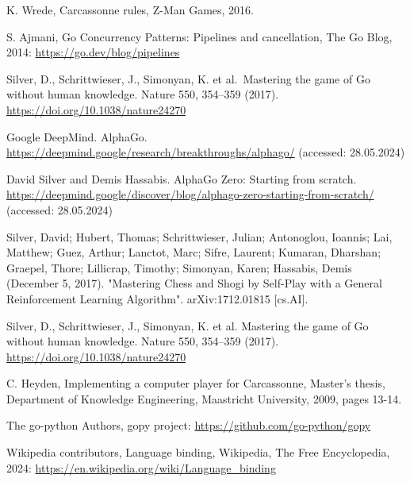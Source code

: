 \documentclass[11pt,twocolumn]{article}
\begin{document}
\begin{thebibliography}{00}
K. Wrede, Carcassonne rules, Z-Man Games, 2016.

S. Ajmani, Go Concurrency Patterns: Pipelines and cancellation, The Go Blog, 2014: \url{https://go.dev/blog/pipelines}

Silver, D., Schrittwieser, J., Simonyan, K. et al.\ Mastering the game of Go without human knowledge. Nature 550, 354–359 (2017). \url{https://doi.org/10.1038/nature24270}

Google DeepMind. AlphaGo. \url{https://deepmind.google/research/breakthroughs/alphago/} (accessed: 28.05.2024)

David Silver and Demis Hassabis. Alpha{G}o {Z}ero: {S}tarting from scratch. \url{https://deepmind.google/discover/blog/alphago-zero-starting-from-scratch/} (accessed: 28.05.2024)

 Silver, David; Hubert, Thomas; Schrittwieser, Julian; Antonoglou, Ioannis; Lai, Matthew; Guez, Arthur; Lanctot, Marc; Sifre, Laurent; Kumaran, Dharshan; Graepel, Thore; Lillicrap, Timothy; Simonyan, Karen; Hassabis, Demis (December 5, 2017). "Mastering Chess and Shogi by Self-Play with a General Reinforcement Learning Algorithm". arXiv:1712.01815 [cs.AI].

Silver, D., Schrittwieser, J., Simonyan, K. et al. Mastering the game of Go without human knowledge. Nature 550, 354–359 (2017). \url{https://doi.org/10.1038/nature24270}

C. Heyden, Implementing a computer player for Carcassonne, Master's thesis, Department of Knowledge Engineering, Maastricht University, 2009,
pages 13-14.

The go-python Authors, gopy project: \url{https://github.com/go-python/gopy}

Wikipedia contributors, Language binding, Wikipedia, The Free Encyclopedia, 2024:
\url{https://en.wikipedia.org/wiki/Language\_binding}
\end{thebibliography}
\end{document}
